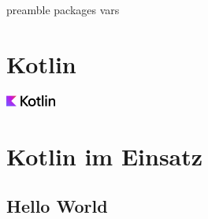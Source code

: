 \RequirePackage{import}
{preamble}
{packages}
{vars}


    \section{Kotlin}\label{sec:kotlin}
    \begin{frame}[c]
        \centering
        \Large
        \includegraphics[scale=3]{../pictures/Kotlin-logo-2021_svg-tex.pdf}
        \linebreak
    \end{frame}

    

    \section{Kotlin im Einsatz}\label{sec:kotlin-im-einsatz}

    \subsection{Hello World}\label{subsec:hello-world}
    \begin{frame}
        \slidehead
    \end{frame}

